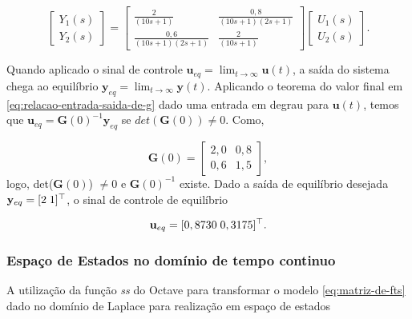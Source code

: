 \begin{equation}
    \label{eq:relacao-entrada-saida-de-g}
    \begin{bmatrix}
        Y_1(s) \\
        Y_2(s)
    \end{bmatrix}
    =
    \begin{bmatrix}
        \frac{2}{(10s+1)}         & \frac{0,8}{(10s+1)(2s+1)} \\
        \frac{0,6}{(10s+1)(2s+1)} & \frac{2}{(10s+1)}
    \end{bmatrix}
    \begin{bmatrix}
        U_1(s) \\
        U_2(s)
    \end{bmatrix}.
\end{equation}

Quando aplicado o sinal de controle $\mathbf{u}_{eq} = \lim_{t \rightarrow
        \infty }\mathbf{u}(t)$, a saída do sistema chega ao equilíbrio $\mathbf{y}_{eq}
    = \lim_{t \rightarrow \infty }\mathbf{y}(t)$. Aplicando o teorema do valor
final em \ref{eq:relacao-entrada-saida-de-g} dado uma entrada em degrau para
$\mathbf{u}(t)$, temos que $\mathbf{u}_{eq} = \mathbf{G}(0)^{-1}\mathbf{y}_{eq}$
se $det(\mathbf{G}(0)) \neq 0$. Como,

\begin{equation}
    \label{eq:ganho-estatico-de-g}
    \mathbf{G}(0)
    =
    \begin{bmatrix}
        2,0 & 0,8 \\
        0,6 & 1,5
    \end{bmatrix},
\end{equation}logo, det($\mathbf{G}(0)$) $\neq 0$ e $\mathbf{G}(0)^{-1}$ existe.
Dado a saída de equilíbrio desejada $\mathbf{y}_{eq} = [2 \thickspace 1]^\top$,
o sinal de controle de equilíbrio

\begin{equation}
    \label{eq:vetor-do-controle-de-equilibrio}
    \mathbf{u}_{eq} = [0,8730 \thickspace 0,3175]^\top.
\end{equation}

\subsubsection{Espaço de Estados no domínio de tempo continuo}
\label{subsub:espaco-de-estados-no-dominio-de-tempo-continuo}

A utilização da função \textit{ss} do Octave para transformar o modelo
\ref{eq:matriz-de-fts} dado no domínio de Laplace para realização em espaço de
estados

